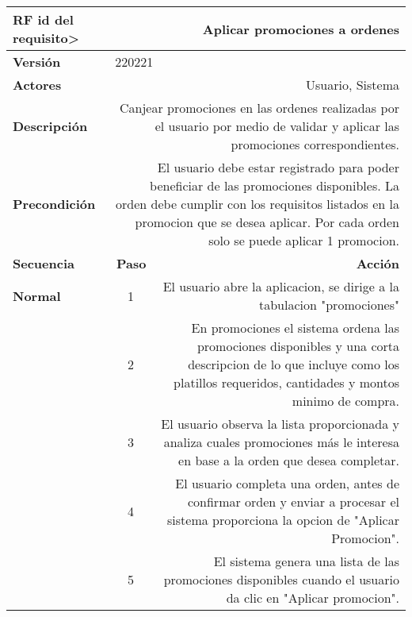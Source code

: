 \documentclass[conference]{IEEEtran}
\begin{document}
\begin{table}[H]
  \centering
  \begin{adjustbox}{width=0.42\textwidth}
    \begin{tabular}{|p{11.215em}|r|r|}
    \toprule
    \textbf{RF id del requisito>} & \multicolumn{2}{p{37.43em}|}{\textbf{Aplicar promociones a ordenes}} \\
    \midrule
    \textbf{Versión} & \multicolumn{2}{l|}{220221} \\
    \midrule
    \textbf{Actores} & \multicolumn{2}{p{37.43em}|}{Usuario, Sistema} \\
    \midrule
    \textbf{Descripción} & \multicolumn{2}{p{37.43em}|}{Canjear promociones en las ordenes realizadas por el usuario por medio de validar y aplicar las promociones correspondientes.} \\
    \midrule
    \textbf{Precondición} & \multicolumn{2}{p{37.43em}|}{El usuario debe estar registrado para poder beneficiar de las promociones disponibles. La orden debe cumplir con los requisitos listados en la promocion que se desea aplicar. Por cada orden solo se puede aplicar 1 promocion.} \\
    \midrule
    \textbf{Secuencia} & \multicolumn{1}{p{5.43em}|}{\textbf{Paso}} & \multicolumn{1}{p{32em}|}{\textbf{Acción}} \\
    \midrule
    \textbf{Normal} & \multicolumn{1}{c|}{1} & \multicolumn{1}{p{32em}|}{El usuario abre la aplicacion, se dirige a la tabulacion "promociones"} \\
    \midrule
    \multicolumn{1}{|r|}{} & \multicolumn{1}{c|}{2} & \multicolumn{1}{p{32em}|}{En promociones el sistema ordena las promociones disponibles y una corta descripcion de lo que incluye como los platillos requeridos, cantidades y montos minimo de compra.} \\
    \midrule
    \multicolumn{1}{|r|}{} & \multicolumn{1}{c|}{3} & \multicolumn{1}{p{32em}|}{El usuario observa la lista proporcionada y analiza cuales promociones más le interesa en base a la orden que desea completar.} \\
    \midrule
    \multicolumn{1}{|r|}{} & \multicolumn{1}{c|}{4} & \multicolumn{1}{p{32em}|}{El usuario completa una orden, antes de confirmar orden y enviar a procesar el sistema proporciona la opcion de "Aplicar Promocion".} \\
    \midrule
    \multicolumn{1}{|r|}{} & \multicolumn{1}{c|}{5} & \multicolumn{1}{p{32em}|}{El sistema genera una lista de las promociones disponibles cuando el usuario da clic en "Aplicar promocion". } \\

\end{tabular}
\end{adjustbox}
\end{table}
\end{document}
